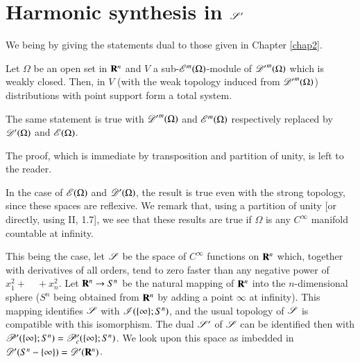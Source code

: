 \section{Harmonic synthesis in \protect\boldmath$\mathscr{S}'$}\label{chap7-sec3}

We being by giving the statements dual to those given in Chapter \ref{chap2}.

\begin{proposition}\label{chap7-prop3.1}
Let $\Omega$ be an open set in $\mathbf{R}^{n}$ and $V$ a sub-$\mathscr{E}^{m}(\Omega)$-module of ${\mathscr{D}'}^{m}(\Omega)$ which is weakly closed. Then, in $V$ (with the weak topology induced from ${\mathscr{D}'}^{m}(\Omega)$) distributions with point support form a total system.

The same statement is true with ${\mathscr{D}'}^{m}(\Omega)$ and $\mathscr{E}^{m}(\Omega)$ respectively replaced by $\mathscr{D}'(\Omega)$ and $\mathscr{E}(\Omega)$.
\end{proposition}

The proof, which is immediate by transposition and partition of unity, is left to the reader.

In the case of $\mathscr{E}(\Omega)$ and $\mathscr{D}'(\Omega)$, the result is true even with the strong topology, since these spaces are reflexive. We remark that, using a partition of unity [or directly, using II, 1.7], we see that these results are true if $\Omega$ is any $C^{\infty}$ manifold countable at infinity.

This being the case, let $\mathscr{S}$ be the space of $C^{\infty}$ functions on $\mathbf{R}^{n}$ which, together with derivatives of all orders, tend to zero faster than any negative power of $x^{2}_{1}+\quad+x^{2}_{n}$. Let $\mathbf{R}^{n}\to S^{n}$ be the natural mapping of $\mathbf{R}^{n}$ into the $n$-dimensional sphere ($S^{n}$ being obtained from $\mathbf{R}^{n}$ by adding a point $\infty$ at infinity). This mapping identifies $\mathscr{S}$ with $\mathscr{I}(\{\infty\};S^{n})$, and the usual topology of $\mathscr{S}$ is compatible with this isomorphism. The dual $\mathscr{S}'$ of $\mathscr{S}$ can be identified then with $\mathscr{P}'(\{\infty\};S^{n})=\mathscr{P}'_{c}(\{\infty\};S^{n})$. We look upon this space as imbedded in $\mathscr{D}'(S^{n}-\{\infty\})=\mathscr{D}'(\mathbf{R}^{n})$.

